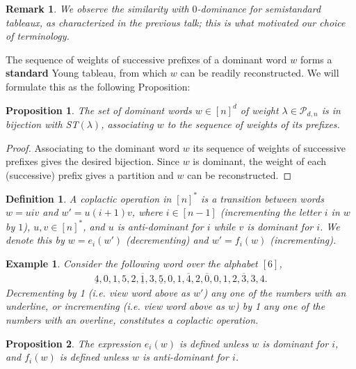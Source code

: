 \documentclass{article}
\newtheorem{prop}{Proposition}
\newtheorem{defn}{Definition}
\newtheorem{exmp}{Example}
\newtheorem{rem}{Remark}
\begin{document}
\begin{rem}
We observe the similarity with $0$-dominance for semistandard tableaux, as characterized in the previous talk; this is what motivated our choice of terminology.
\end{rem}
The sequence of weights of successive prefixes of a dominant word $w$ forms a \textbf{standard} Young tableau, from which $w$ can be readily reconstructed. We will formulate this as the following Proposition:
\begin{prop}
The set of dominant words $w \in [n]^d$ of weight $\lambda \in \mathcal{P}_{d,n}$ is in bijection with ST$(\lambda)$, associating $w$ to the sequence of weights of its prefixes. 
\end{prop}
\begin{proof}
Associating to the dominant word $w$ its sequence of weights of successive prefixes gives the desired bijection. Since $w$ is dominant, the weight of each (successive) prefix gives a partition and $w$ can be reconstructed.
\end{proof}
\begin{defn}
A coplactic operation in $[n]^*$ is a transition between words $w=uiv$ and $w'=u(i+1)v$, where $i \in [n-1]$ (incrementing the letter $i$ in $w$ by $1$), $u,v \in [n]^*$, and $u$ is anti-dominant for $i$ while $v$ is dominant for $i$. We denote this by $w=e_i(w')$ (decrementing) and $w'=f_i(w)$ (incrementing). 
\end{defn}
\begin{exmp}
Consider the following word over the alphabet $[6]$,
\begin{align}
 \underline{4},0,1,5,2,\overline{\underline{1}},3,\underline{5},0,1,\overline{4},2,\overline{0},0,1,2,\overline{3},3,4.
\end{align}
Decrementing by 1 (i.e. view word above as $w'$)
any one of the numbers with an underline, or incrementing (i.e. view word above as $w$) by 1 any one of the
numbers with an overline, constitutes a coplactic operation.
\end{exmp}
\newpage
\begin{prop}
The expression $e_i(w)$ is defined unless $w$ is dominant for $i$, and $f_i(w)$ is defined unless $w$ is anti-dominant for $i$.
\end{prop}
\end{document}
